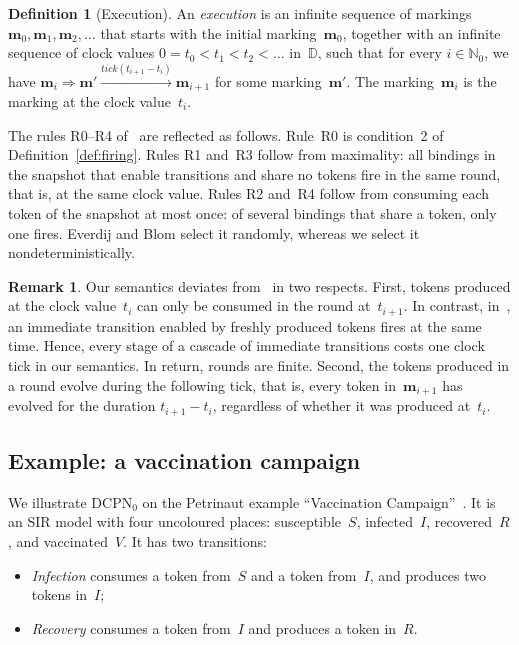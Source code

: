 \documentclass[11pt]{article}
\theoremstyle{definition}
\newcommand{\NatZero}{\mathbb{N}_0}
\newcommand{\Dom}{\mathbb{D}}
\newcommand{\bfm}{\mathbf{m}}
\newcommand{\tickto}[1]{\xrightarrow{\mathit{tick}(#1)}}
\newcommand{\DCPN}[1]{\texorpdfstring{\textup{DCPN}\ensuremath{_{#1}}}{DCPN#1}}
\newtheorem{definition}{Definition}
\newtheorem{remark}{Remark}
\begin{document}
\begin{definition}[Execution]\label{def:execution}
  An \emph{execution} is an infinite sequence of markings
  $\bfm_0, \bfm_1, \bfm_2, \dots$ that starts with the initial
  marking~$\bfm_0$, together with an infinite sequence of clock values
  $0 = t_0 < t_1 < t_2 < \dots$ in~$\Dom$, such that for every
  $i \in \NatZero$, we have
  $\bfm_i \Rightarrow \bfm' \tickto{t_{i+1} - t_i} \bfm_{i + 1}$ for some
  marking~$\bfm'$. The marking~$\bfm_i$ is the marking at the clock
  value~$t_i$.
\end{definition}

The rules R0--R4 of~\cite{EverdijBlom2005} are reflected as follows. Rule~R0
is condition~2 of Definition~\ref{def:firing}. Rules R1 and~R3 follow from
maximality: all bindings in the snapshot that enable transitions and share no tokens
fire in the same round, that is, at the same clock value. Rules R2 and~R4
follow from consuming each token of the snapshot at most once: of several bindings
that share a token, only one fires. Everdij and Blom select it randomly,
whereas we select it nondeterministically.

\begin{remark}
  Our semantics deviates from~\cite{EverdijBlom2005} in two respects. First,
  tokens produced at the clock value~$t_i$ can only be consumed in the round
  at~$t_{i+1}$. In contrast, in~\cite{EverdijBlom2005}, an immediate
  transition enabled by freshly produced tokens fires at the same time. Hence,
  every stage of a cascade of immediate transitions costs one clock tick in
  our semantics. In return, rounds are finite. Second, the
  tokens produced in a round evolve during the following tick, that is, every
  token in~$\bfm_{i + 1}$ has evolved for the duration $t_{i+1} - t_i$,
  regardless of whether it was produced at~$t_i$.
\end{remark}

\subsection{Example: a vaccination campaign}\label{sec:vaccination}

We illustrate \DCPN{0} on the Petrinaut example ``Vaccination
Campaign''~\cite{Petrinaut}. It is an SIR model with four uncoloured places: susceptible~$S$,
infected~$I$, recovered~$R$, and vaccinated~$V$. It has two transitions:

\begin{itemize}
  \item \emph{Infection} consumes a token from~$S$ and a token from~$I$, and
    produces two tokens in~$I$;
  \item \emph{Recovery} consumes a token from~$I$ and produces a token
    in~$R$.
\end{itemize}
\end{document}
